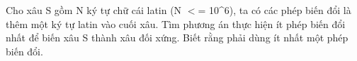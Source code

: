Cho xâu S gồm N ký tự chữ cái latin (N $<$= 10\textasciicircum6), ta có các phép biến đổi là thêm một ký tự latin vào cuối xâu. Tìm phương án thực hiện ít phép biến đổi nhất để biến xâu S thành xâu đối xứng. Biết rằng phải dùng ít nhất một phép biến đổi.